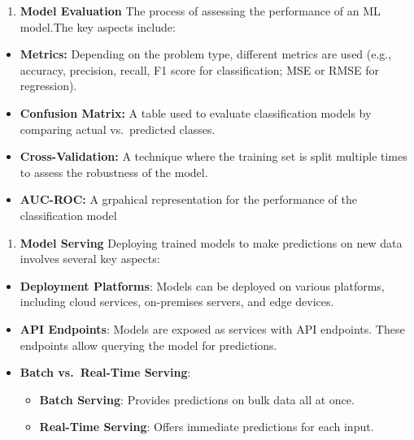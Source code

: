 \documentclass[
  letterpaper,
  DIV=11,
  numbers=noendperiod]{scrartcl}
\providecommand{\tightlist}{%
  \setlength{\itemsep}{0pt}\setlength{\parskip}{0pt}}\usepackage{longtable,booktabs,array}
\begin{document}
\begin{enumerate}
\def\labelenumi{\arabic{enumi}.}
\setcounter{enumi}{3}
\tightlist
\item
  \textbf{Model Evaluation} The process of assessing the performance of
  an ML model.The key aspects include:
\end{enumerate}

\begin{itemize}
\tightlist
\item
  \textbf{Metrics:} Depending on the problem type, different metrics are
  used (e.g., accuracy, precision, recall, F1 score for classification;
  MSE or RMSE for regression).
\item
  \textbf{Confusion Matrix:} A table used to evaluate classification
  models by comparing actual vs.~predicted classes.
\item
  \textbf{Cross-Validation:} A technique where the training set is split
  multiple times to assess the robustness of the model.
\item
  \textbf{AUC-ROC:} A grpahical representation for the performance of
  the classification model
\end{itemize}

\begin{enumerate}
\def\labelenumi{\arabic{enumi}.}
\setcounter{enumi}{4}
\tightlist
\item
  \textbf{Model Serving} Deploying trained models to make predictions on
  new data involves several key aspects:
\end{enumerate}

\begin{itemize}
\tightlist
\item
  \textbf{Deployment Platforms}: Models can be deployed on various
  platforms, including cloud services, on-premises servers, and edge
  devices.
\item
  \textbf{API Endpoints}: Models are exposed as services with API
  endpoints. These endpoints allow querying the model for predictions.
\item
  \textbf{Batch vs.~Real-Time Serving}:

  \begin{itemize}
  \tightlist
  \item
    \textbf{Batch Serving}: Provides predictions on bulk data all at
    once.
  \item
    \textbf{Real-Time Serving}: Offers immediate predictions for each
    input.
  \end{itemize}
\end{itemize}
\end{document}
